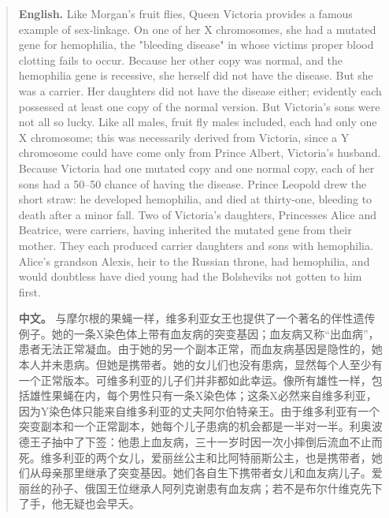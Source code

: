 \begin{quote}
\noindent\textbf{English.} Like Morgan's fruit flies, Queen Victoria provides a famous example of sex-linkage. On one of her X chromosomes, she had a mutated gene for hemophilia, the "bleeding disease" in whose victims proper blood clotting fails to occur. Because her other copy was normal, and the hemophilia gene is recessive, she herself did not have the disease. But she was a carrier. Her daughters did not have the disease either; evidently each possessed at least one copy of the normal version. But Victoria's sons were not all so lucky. Like all males, fruit fly males included, each had only one X chromosome; this was necessarily derived from Victoria, since a Y chromosome could have come only from Prince Albert, Victoria's husband. Because Victoria had one mutated copy and one normal copy, each of her sons had a 50--50 chance of having the disease. Prince Leopold drew the short straw: he developed hemophilia, and died at thirty-one, bleeding to death after a minor fall. Two of Victoria's daughters, Princesses Alice and Beatrice, were carriers, having inherited the mutated gene from their mother. They each produced carrier daughters and sons with hemophilia. Alice's grandson Alexis, heir to the Russian throne, had hemophilia, and would doubtless have died young had the Bolsheviks not gotten to him first.

\smallskip
\noindent\textbf{中文。} 与摩尔根的果蝇一样，维多利亚女王也提供了一个著名的伴性遗传例子。她的一条X染色体上带有血友病的突变基因；血友病又称“出血病”，患者无法正常凝血。由于她的另一个副本正常，而血友病基因是隐性的，她本人并未患病。但她是携带者。她的女儿们也没有患病，显然每个人至少有一个正常版本。可维多利亚的儿子们并非都如此幸运。像所有雄性一样，包括雄性果蝇在内，每个男性只有一条X染色体；这条X必然来自维多利亚，因为Y染色体只能来自维多利亚的丈夫阿尔伯特亲王。由于维多利亚有一个突变副本和一个正常副本，她每个儿子患病的机会都是一半对一半。利奥波德王子抽中了下签：他患上血友病，三十一岁时因一次小摔倒后流血不止而死。维多利亚的两个女儿，爱丽丝公主和比阿特丽斯公主，也是携带者，她们从母亲那里继承了突变基因。她们各自生下携带者女儿和血友病儿子。爱丽丝的孙子、俄国王位继承人阿列克谢患有血友病；若不是布尔什维克先下了手，他无疑也会早夭。
\end{quote}

